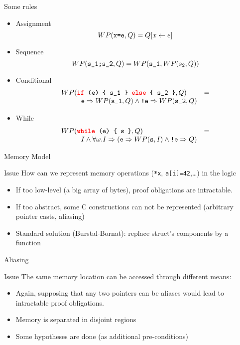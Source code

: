 \documentclass[pdf]{beamer}
\begin{document}
\begin{frame}{Some rules}
\begin{itemize}
\item Assignment
\[
WP(\textrm{\ttfamily\upshape{}x=e},Q) = Q[x\leftarrow e]
\]
\item Sequence
\[
WP(\textrm{\ttfamily\upshape{}s\_{}1;s\_{}2},Q) = WP(\textrm{\ttfamily\upshape{}s\_{}1},WP(s_2;Q))
\]
\item Conditional
\[
\begin{array}{lc}
WP(\textrm{\ttfamily\upshape{}\textbf{\textcolor{red}{if}}~(e)~\{~s\_{}1~\}~\textbf{\textcolor{red}{else}}~\{~s\_{}2~\}},Q) & = \\
\hspace*{1cm}\textrm{\ttfamily\upshape{}e}\Rightarrow WP(\textrm{\ttfamily\upshape{}s\_{}1},Q) \wedge \textrm{\ttfamily\upshape{}!e}\Rightarrow
WP(\textrm{\ttfamily\upshape{}s\_{}2},Q)
\end{array}
\]
\item While
\[
\begin{array}{lc}
WP(\textrm{\ttfamily\upshape{}\textbf{\textcolor{red}{while}}~(e)~\{~s~\}},Q) & =  \\
\hspace*{1cm}I \wedge
 \forall\omega. I\Rightarrow(\textrm{\ttfamily\upshape{}e}\Rightarrow WP(\textrm{\ttfamily\upshape{}s},I) \wedge
                             \textrm{\ttfamily\upshape{}!e}\Rightarrow Q)
\end{array}
\]
\end{itemize}
\end{frame}

\begin{frame}[fragile]{Memory Model}
\begin{block}{Issue}
How can we represent memory operations (\verb|*x|,
\verb|a[i]=42|,\ldots) in the logic
\end{block}

\begin{itemize}
\item If too low-level (a big array of bytes), proof obligations are
  intractable.
\item If too abstract, some C constructions can not be represented
  (arbitrary pointer casts, aliasing)
\item Standard solution (Burstal-Bornat): replace struct's components
  by a function
\end{itemize}
\end{frame}

\begin{frame}{Aliasing}
\begin{block}{Issue}
The same memory location can be accessed through different means:

\end{block}
\begin{itemize}
\item Again, supposing that any two pointers can be aliases would lead
  to intractable proof obligations.
\item Memory is separated in disjoint regions
\item Some hypotheses are done (as additional pre-conditions)
\end{itemize}
\end{frame}
\end{document}
